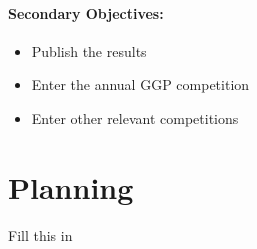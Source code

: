 \paragraph{Secondary Objectives:}
\begin{itemize}
\item Publish the results
\item Enter the annual GGP competition
\item Enter other relevant competitions
\end{itemize}




\section{Planning}

Fill this in





